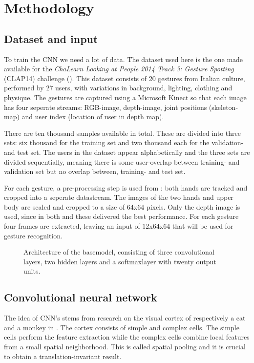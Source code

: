 \documentclass[twocolumn]{phdsymp} %
\begin{document}

\section{Methodology}
\subsection{Dataset and input}
To train the CNN we need a lot of data. The dataset used here is the one made available for the \textit{ChaLearn Looking at People 2014 Track 3: Gesture Spotting} (CLAP14) challenge (\cite{escalera_chalearn_2014}). This dataset consists of 20 gestures from Italian culture, performed by 27 users, with variations in background, lighting, clothing and physique. The gestures are captured using a Microsoft Kinect \cite{kuhn2011kinect} so that each image has four seperate streams: RGB-image, depth-image, joint positions (skeleton-map) and user index (location of user in depth map).

There are ten thousand samples available in total. These are divided into three sets: six thousand for the training set and two thousand each for the validation- and test set. The users in the dataset appear alphabetically and the three sets are divided sequentially, meaning there is some user-overlap between training- and validation set but no overlap between, training- and test set.

For each gesture, a pre-processing step is used from \cite{lionel}: both hands are tracked and cropped into a seperate datastream. The images of the two hands and upper body are scaled and cropped to a size of 64x64 pixels. Only the depth image is used, since in both \cite{wu_deep_2014} and \cite{lionel} these delivered the best performance. For each gesture four frames are extracted, leaving an input of 12x64x64 that will be used for gesture recognition.
\begin{figure}
	\def\svgwidth{\textwidth}
	
	\caption{Architecture of the basemodel, consisting of three convolutional layers, two hidden layers and a softmaxlayer with twenty output units.}\label{fig:model}
\end{figure}
\subsection{Convolutional neural network}
The idea of CNN's stems from research on the visual cortex of respectively a cat and a monkey in \cite{hubel1968receptive}. The cortex consists of simple and complex cells. The simple cells perform the feature extraction while the complex cells combine local features from a small spatial neighborhood. This is called spatial pooling and it is crucial to obtain a translation-invariant result.
\end{document}
